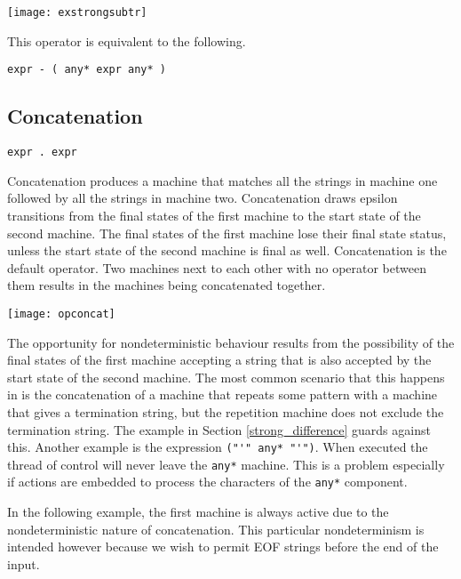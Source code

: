 \documentclass[letterpaper,11pt,oneside]{book}
\newcommand{\verbspace}{\vspace{10pt}}
\newcommand{\graphspace}{\vspace{10pt}}
\begin{document}
\graphspace
\begin{center}
\texttt{[image: exstrongsubtr]}
\end{center}
\graphspace

This operator is equivalent to the following.

\verbspace
\begin{verbatim}
expr - ( any* expr any* )
\end{verbatim}

\subsection{Concatenation}

\verb|expr . expr|
\verbspace

Concatenation produces a machine that matches all the strings in machine one followed by all
the strings in machine two.  Concatenation draws epsilon transitions from the
final states of the first machine to the start state of the second machine. The
final states of the first machine lose their final state status, unless the
start state of the second machine is final as well. 
Concatenation is the default operator. Two machines next to each other with no
operator between them results in the machines being concatenated together.  

\graphspace
\begin{center}
\texttt{[image: opconcat]}
\end{center}
\graphspace

The opportunity for nondeterministic behaviour results from the possibility of
the final states of the first machine accepting a string that is also accepted
by the start state of the second machine.
The most common scenario that this happens in is the
concatenation of a machine that repeats some pattern with a machine that gives
a termination string, but the repetition machine does not exclude the
termination string. The example in Section \ref{strong_difference}
guards against this. Another example is the expression \verb|("'" any* "'")|.
When executed the thread of control will
never leave the \verb|any*| machine.  This is a problem especially if actions
are embedded to process the characters of the \verb|any*| component.

In the following example, the first machine is always active due to the
nondeterministic nature of concatenation. This particular nondeterminism is intended
however because we wish to permit EOF strings before the end of the input.
\end{document}
